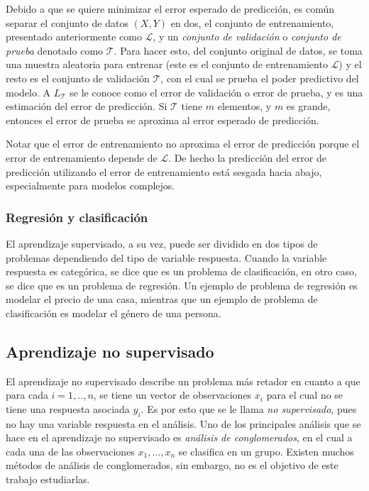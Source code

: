 Debido a que se quiere minimizar el error esperado de predicción, es común separar el conjunto de datos $(X, Y)$ en dos, el conjunto de entrenamiento, presentado anteriormente como $\mathcal{L}$, y un \textit{conjunto de validación} o \textit{conjunto de prueba} denotado como $\mathcal{T}$. Para hacer esto, del conjunto original de datos, se toma una muestra aleatoria para entrenar (este es el conjunto de entrenamiento $\mathcal{L}$) y el resto es el conjunto de validación $\mathcal{T}$, con el cual se prueba el poder predictivo del modelo. A $L_{\mathcal{T}}$ se le conoce como el error de validación o error de prueba, y es una estimación del error de predicción. Si $\mathcal{T}$ tiene $m$ elementos, y $m$ es grande, entonces el error de prueba se aproxima al error esperado de predicción.

Notar que el error de entrenamiento no aproxima el error de predicción porque el error de entrenamiento depende de $\mathcal{L}$. De hecho la predicción del error de predicción utilizando el error de entrenamiento está sesgada hacia abajo, especialmente para modelos complejos.

\subsubsection{Regresión y clasificación}

El aprendizaje supervisado, a su vez, puede ser dividido en dos tipos de problemas dependiendo del tipo de variable respuesta. Cuando la variable respuesta es categórica, se dice que es un problema de clasificación, en otro caso, se dice que es un problema de regresión. Un ejemplo de problema de regresión es modelar el precio de una casa, mientras que un ejemplo de problema de clasificación es modelar el género de una persona. 

\subsection{Aprendizaje no supervisado}

El aprendizaje no supervisado describe un problema más retador en cuanto a que para cada $i = 1, .., n$, se tiene un vector de observaciones $x_i$ para el cual no se tiene una respuesta asociada $y_i$. Es por esto que se le llama \textit{no supervisado}, pues no hay una variable respuesta en el análisis. Uno de los principales análisis que se hace en el aprendizaje no supervisado es \textit{análisis de conglomerados}, en el cual a cada una de las observaciones $x_1, ..., x_n$ se clasifica en un grupo. Existen muchos métodos de análisis de conglomerados, sin embargo, no es el objetivo de este trabajo estudiarlas.


